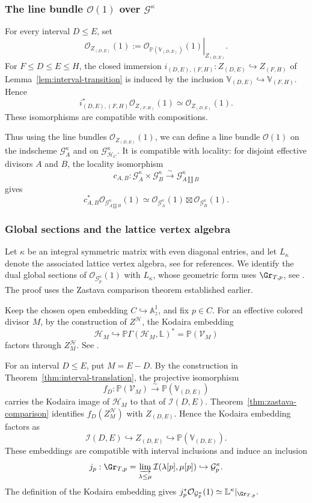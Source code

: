 \documentclass{amsart}
\numberwithin{equation}{section}
\numberwithin{figure}{section}
\theoremstyle{definition}
\theoremstyle{remark}
\renewcommand{\c}[1]{\mathcal{#1}}
\renewcommand{\b}[1]{\mathbb{#1}}
\begin{document}
\subsubsection{The line bundle $\c O(1)$ over $\c G^\kappa$} 
\label{subsec:grassmannian-line-bundle}

For every interval $D\leq E$, set
\[
\c O_{Z_{(D,E)}}(1)
:=
\left.
\c O_{\b P(\b V_{(D,E)})}(1)
\right|_{Z_{(D,E)}}.
\]
For $F\leq D\leq E\leq H$, the closed immersion
$i_{(D,E),(F,H)}: Z_{(D,E)}\hookrightarrow Z_{(F,H)}$
of Lemma~\ref{lem:interval-transition} is induced by
the  inclusion $\b V_{(D,E)}\hookrightarrow\b V_{(F,H)}$.
Hence
\[
i_{(D,E),(F,H)}^*
\c O_{Z_{(F,H)}}(1)
\simeq
\c O_{Z_{(D,E)}}(1).
\]
These isomorphisms are compatible with compositions.

Thus using the line bundles $\c O_{Z_{(D,E)}}(1)$, we can define a line
bundle $\c O(1)$ on the indscheme $\c G^\kappa_A$ and on
$\c G^\kappa_{\c H_C}$. It is compatible with locality:
for disjoint effective divisors $A$ and $B$, the
locality isomorphism
\[
c_{A,B}:
\c G^\kappa_A\times\c G^\kappa_B
\xrightarrow{\sim}
\c G^\kappa_{A\coprod B}
\]
gives
\[
c_{A,B}^*\c O_{\c G^\kappa_{A\coprod B}}(1)
\simeq
\c O_{\c G^\kappa_A}(1)
\boxtimes
\c O_{\c G^\kappa_B}(1).
\]

\subsubsection{Global sections and the lattice vertex algebra}
\label{subsec:lattice-vertex-algebra}

Let $\kappa$ be an integral symmetric matrix with even
diagonal entries, and let $L_\kappa$ denote the
associated lattice vertex algebra, see
\cite{frenkel2004vertex,kac1998vertex} for references.
We identify the dual global sections of
$\c O_{\c G^\kappa_p}(1)$ with $L_\kappa$, whose geometric form uses
$\Gr_{T,p}$, see \cite[\S3]{zhu2009affine}.
The proof uses the Zastava comparison theorem established earlier.

Keep the chosen open embedding
$C\hookrightarrow\b A^1_z$, and fix $p\in C$.
For an effective colored divisor $M$, by the construction of $Z^\c H$, the Kodaira embedding
\[
\c H_M\hookrightarrow\b P\Gamma(\c H_M,\b L)^*=\b P(\c V_M)
\]
factors through $Z^{\c H}_M$. See \cite[\S2.4.3]{mirkovic2021loop}.

For an interval $D\leq E$, put $M=E-D$. By the construction in
Theorem~\ref{thm:interval-translation}, the projective isomorphism
\[
f_D:
\b P(\c V_M)\xrightarrow{\sim}
\b P(\b V_{(D,E)})
\]
carries the Kodaira image of $\c H_M$ to that of $\c I(D,E)$.
Theorem~\ref{thm:zastava-comparison} identifies
$f_D(Z^{\c H}_M)$ with $Z_{(D,E)}$.
Hence the Kodaira embedding factors as
\[
\c I(D,E)\hookrightarrow Z_{(D,E)}
\hookrightarrow\b P(\b V_{(D,E)}).
\]
These embeddings are compatible with interval
inclusions and induce an inclusion
\[
j_p:
\Gr_{T,p}
=
\varinjlim_{\lambda\leq\mu}
\c I(\lambda[p],\mu[p])
\hookrightarrow
\c G^\kappa_p.
\]
The definition of the Kodaira embedding gives
$j_p^*\c O_{\c G^\kappa_p}(1) \simeq\b L^\kappa|_{\Gr_{T,p}}.$
\end{document}
